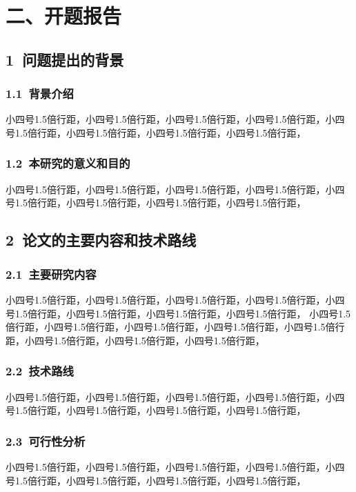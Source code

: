 \section{二、开题报告}
\begin{spacing}{1.5}
     \fangsong \raggedright 
    \setlength{\parindent}{2em}
\subsection{1~问题提出的背景}
    \subsubsection{1.1~背景介绍}         
    小四号1.5倍行距，小四号1.5倍行距，小四号1.5倍行距，小四号1.5倍行距，小四号1.5倍行距，小四号1.5倍行距，小四号1.5倍行距，小四号1.5倍行距，
    
    \subsubsection{1.2~本研究的意义和目的}         
    小四号1.5倍行距，小四号1.5倍行距，小四号1.5倍行距，小四号1.5倍行距，小四号1.5倍行距，小四号1.5倍行距，小四号1.5倍行距，小四号1.5倍行距，


\subsection{2~论文的主要内容和技术路线}
        \subsubsection{2.1~主要研究内容}
        小四号1.5倍行距，小四号1.5倍行距，小四号1.5倍行距，小四号1.5倍行距，小四号1.5倍行距，小四号1.5倍行距，小四号1.5倍行距，小四号1.5倍行距，
        小四号1.5倍行距，小四号1.5倍行距，小四号1.5倍行距，小四号1.5倍行距，小四号1.5倍行距，小四号1.5倍行距，小四号1.5倍行距，小四号1.5倍行距，

        \subsubsection{2.2~技术路线}
        小四号1.5倍行距，小四号1.5倍行距，小四号1.5倍行距，小四号1.5倍行距，小四号1.5倍行距，小四号1.5倍行距，小四号1.5倍行距，小四号1.5倍行距，


        \subsubsection{2.3~可行性分析}
        小四号1.5倍行距，小四号1.5倍行距，小四号1.5倍行距，小四号1.5倍行距，小四号1.5倍行距，小四号1.5倍行距，小四号1.5倍行距，小四号1.5倍行距，


\end{spacing}
